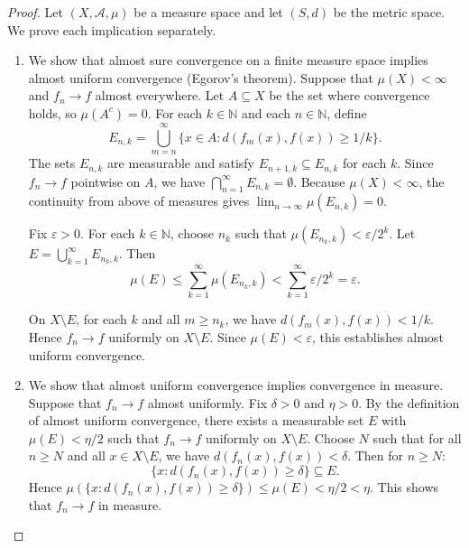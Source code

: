 \begin{proof}
    Let $(X, \mathcal{A}, \mu)$ be a measure space and let $(S,d)$ be the metric space. We prove each implication separately.

    \begin{enumerate}
        \item We show that almost sure convergence on a finite measure space implies almost uniform convergence (Egorov's theorem). Suppose that $\mu(X) < \infty$ and $f_n \to f$ almost everywhere. Let $A \subseteq X$ be the set where convergence holds, so $\mu(A^c) = 0$. For each $k \in \mathbb{N}$ and each $n \in \mathbb{N}$, define
        $$E_{n,k} = \bigcup_{m=n}^\infty \{x \in A : d(f_m(x), f(x)) \geq 1/k\}.$$
        The sets $E_{n,k}$ are measurable and satisfy $E_{n+1,k} \subseteq E_{n,k}$ for each $k$. Since $f_n \to f$ pointwise on $A$, we have $\bigcap_{n=1}^\infty E_{n,k} = \emptyset$. Because $\mu(X) < \infty$, the continuity from above of measures gives $\lim_{n \to \infty} \mu(E_{n,k}) = 0$.

        Fix $\varepsilon > 0$. For each $k \in \mathbb{N}$, choose $n_k$ such that $\mu(E_{n_k,k}) < \varepsilon/2^k$. Let $E = \bigcup_{k=1}^\infty E_{n_k,k}$. Then
        $$\mu(E) \leq \sum_{k=1}^\infty \mu(E_{n_k,k}) < \sum_{k=1}^\infty \varepsilon/2^k = \varepsilon.$$

        On $X \setminus E$, for each $k$ and all $m \geq n_k$, we have $d(f_m(x), f(x)) < 1/k$. Hence $f_n \to f$ uniformly on $X \setminus E$. Since $\mu(E) < \varepsilon$, this establishes almost uniform convergence.

        \item We show that almost uniform convergence implies convergence in measure. Suppose that $f_n \to f$ almost uniformly. Fix $\delta > 0$ and $\eta > 0$. By the definition of almost uniform convergence, there exists a measurable set $E$ with $\mu(E) < \eta/2$ such that $f_n \to f$ uniformly on $X \setminus E$. Choose $N$ such that for all $n \geq N$ and all $x \in X \setminus E$, we have $d(f_n(x), f(x)) < \delta$. Then for $n \geq N$:
        $$\{x : d(f_n(x), f(x)) \geq \delta\} \subseteq E.$$
        Hence $\mu(\{x : d(f_n(x), f(x)) \geq \delta\}) \leq \mu(E) < \eta/2 < \eta$. This shows that $f_n \to f$ in measure.


\end{enumerate}
\end{proof}
